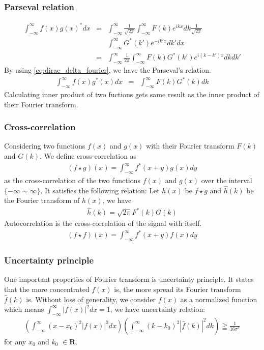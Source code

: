 \documentclass{beamer}
\begin{document}
\begin{frame}
\frametitle{Parseval relation}
\begin{eqnarray}
\int_{-\infty}^{\infty}f(x)g(x)^* dx &=&\int_{-\infty}^{\infty}  \frac{1}{\sqrt{2\pi}} \int_{-\infty}^{\infty} F(k) e^{ikx}dk \frac{1}{\sqrt{2\pi}} \nonumber \\
&&\int_{-\infty}^{\infty}G^*(k') e^{-ik'x}dk' dx\nonumber \\
&=&\int_{-\infty}^{\infty} \frac{1}{2\pi} \int_{-\infty}^{\infty} F(k)G^*(k')e^{i(k-k')x} dk dk' \nonumber
\end{eqnarray}
By using \ref{eq:dirac_delta_fourier}, we have the Parseval's relation.
\begin{eqnarray}
\int_{-\infty}^{\infty}f(x)g^*(x) dx &=& \int_{-\infty}^{\infty}F(k)G^*(k)dk
\label{eq:parseval_relation}
\end{eqnarray}
Calculating inner product of two fuctions gets same result as the inner product of their Fourier transform.
\end{frame}
\begin{frame}
\frametitle{Cross-correlation}
Considering two functions $f(x)$ and $g(x)$ with their Fourier transform $F(k)$ and $G(k)$. We define cross-correlation as
\begin{eqnarray}
(f\star g)(x) = \int_{-\infty}^{\infty}f^*(x+y)g(x)dy
\label{eq:cross_correlation}
\end{eqnarray}
as the cross-correlation of the two functions $f(x)$ and $g(x)$ over the interval $\{ -\infty \sim \infty \}$. It satisfies the following relation:
Let $h(x)$ be $f \star g$ and $\hat{h}(k)$ be the Fourier transform of $h(x)$, we have
\begin{eqnarray}
\hat{h}(k) = \sqrt{2\pi}F^*(k)G(k)
\label{eq:cross_correlation_FT}
\end{eqnarray}
Autocorrelation is the cross-correlation of the signal with itself.
\begin{eqnarray}
(f\star f)(x) = \int_{-\infty}^{\infty}f^*(x+y)f(x)dy
\label{eq:autocorrelation}
\end{eqnarray}
\end{frame}
\begin{frame}
\frametitle{Uncertainty principle}
One important properties of Fourier transform is uncertainty principle. It states that the more concentrated $f(x)$ is, the more spread its Fourier transform $\hat{f}(k)$ is.
Without loss of generality, we consider $f(x)$ as a normalized function which means $\int_{-\infty}^{\infty}|f(x)|^2 dx = 1$, we have uncertainty relation:
\begin{eqnarray}
\left( \int_{-\infty}^{\infty}(x-x_0)^2|f(x)|^2 dx\right) \left( \int_{-\infty}^{\infty}(k-k_0)^2|\hat{f}(k)|^2 dk\right) \geqq \frac{1}{16\pi^2}
\label{eq:uncertainty_wiki}
\end{eqnarray}
for any $x_0$ and $k_0$ $\in \mathbf{R}$.~\cite{wiki_FT}
\end{frame}
\end{document}
